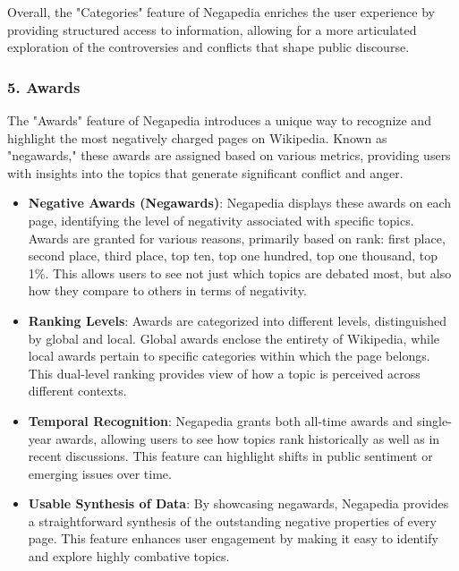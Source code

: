Overall, the "Categories" feature of Negapedia enriches the user experience by providing structured access to information, allowing for a more articulated exploration of the controversies and conflicts that shape public discourse.

\subsubsection{5. Awards}

The "Awards" feature of Negapedia introduces a unique way to recognize and highlight the most negatively charged pages on Wikipedia. Known as "negawards," these awards are assigned based on various metrics, providing users with insights into the topics that generate significant conflict and anger.

\begin{itemize}
    \item \textbf{Negative Awards (Negawards)}: Negapedia displays these awards on each page, identifying the level of negativity associated with specific topics. Awards are granted for various reasons, primarily based on rank: first place, second place, third place, top ten, top one hundred, top one thousand, top 1\%. This allows users to see not just which topics are debated most, but also how they compare to others in terms of negativity.
    
    \item \textbf{Ranking Levels}: Awards are categorized into different levels, distinguished by global and local. Global awards enclose the entirety of Wikipedia, while local awards pertain to specific categories within which the page belongs. This dual-level ranking provides view of how a topic is perceived across different contexts.
    
    \item \textbf{Temporal Recognition}: Negapedia grants both all-time awards and single-year awards, allowing users to see how topics rank historically as well as in recent discussions. This feature can highlight shifts in public sentiment or emerging issues over time.
    
    \item \textbf{Usable Synthesis of Data}: By showcasing negawards, Negapedia provides a straightforward synthesis of the outstanding negative properties of every page. This feature enhances user engagement by making it easy to identify and explore highly combative topics.
\end{itemize}

